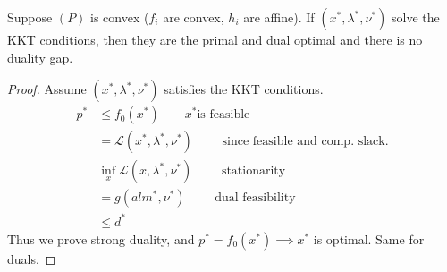 \documentclass[class=article,crop=false]{standalone}
\begin{document}
\begin{thm}
	Suppose $ (P)$ is convex ($ f_i$ are convex, $ h_i$ are affine). If $ (x^* ,\lambda^* ,\nu^* )$ solve the KKT conditions, then they are the primal and dual optimal and there is no duality gap.
\end{thm}
\begin{proof}
	Assume $ (x^* ,\lambda^* ,\nu^* )$ satisfies the KKT conditions.
	\begin{align*}
		p^* &\leq f_0(x^* ) \qquad  x^* \text{is feasible }\\
		    &= \mathscr{L}(x^* ,\lambda^* ,\nu^* ) \qquad \text{ since feasible and comp. slack.} \\
		    &\inf_x \mathscr{L}(x,\lambda^* ,\nu^* ) \qquad \text{ stationarity}  \\
		    &= g(alm^* ,\nu^* ) \qquad  \text{ dual feasibility} \\
		    &\leq d^*  
	\end{align*}
	Thus we prove strong duality, and $ p^* =f_0(x^* ) \implies x^* $ is optimal. Same for duals. 
\end{proof}
\end{document}
